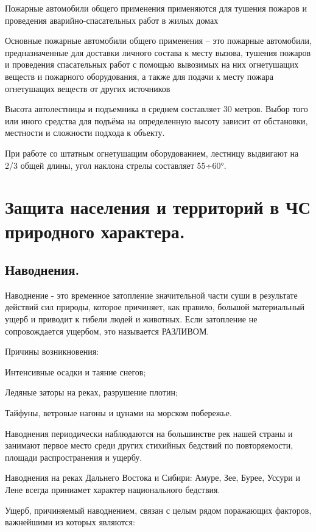 \documentclass[a4paper, 12pt]{article}
\theoremstyle{definition}
\begin{document}
        Пожарные автомобили общего применения применяются для тушения пожаров и проведения аварийно-спасательных работ в жилых домах

        Основные пожарные автомобили общего применения – это пожарные автомобили, предназначенные для доставки личного состава к месту вызова, тушения пожаров и проведения спасательных работ с помощью вывозимых на них огнетушащих веществ и пожарного оборудования, а также для подачи к месту пожара огнетушащих веществ от других источников

        Высота автолестницы и подъемника в среднем составляет 30 метров. Выбор того или иного средства для подъёма на определенную высоту зависит от обстановки, местности и сложности подхода к объекту.

        При работе со штатным огнетушащим оборудованием, лестницу выдвигают на 2/3 общей длины, угол наклона стрелы составляет 55÷60°.

        \section{Защита населения и территорий в ЧС природного характера.}

        \subsection{Наводнения.}

        Наводнение - это временное затопление значительной части суши в результате действий сил природы, которое причиняет, как правило, большой материальный ущерб и приводит к гибели людей и животных.
        Если затопление не сопровождается ущербом, это называется РАЗЛИВОМ. 

        Причины возникновения:

        Интенсивные осадки и таяние снегов;

        Ледяные заторы на реках, разрушение плотин;

        Тайфуны, ветровые нагоны и цунами на морском побережье.

        Наводнения  периодически наблюдаются на большинстве рек нашей страны и занимают первое место среди других стихийных бедствий по повторяемости, площади распространения и ущербу.

        Наводнения на реках Дальнего Востока и Сибири: Амуре, Зее, Бурее, Уссури и Лене всегда приниамет характер национального бедствия.

        Ущерб, причиняемый наводнением, связан с целым
        рядом поражающих факторов, важнейшими из которых являются:
\end{document}
